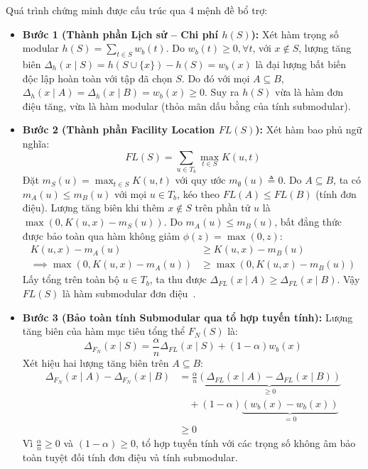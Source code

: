 \begin{cm}
\label{proof:sketch_submodular}
Quá trình chứng minh được cấu trúc qua 4 mệnh đề bổ trợ:

\begin{itemize}
    \item \textbf{Bước 1 (Thành phần Lịch sử -- Chi phí $h(S)$):}
    Xét hàm trọng số modular $h(S) = \sum_{t \in S} w_b(t)$. Do $w_b(t) \ge 0, \forall t$, với $x \notin S$, lượng tăng biên $\Delta_h(x \mid S) = h(S \cup \{x\}) - h(S) = w_b(x)$ là đại lượng bất biến độc lập hoàn toàn với tập đã chọn $S$. Do đó với mọi $A \subseteq B$, $\Delta_h(x \mid A) = \Delta_h(x \mid B) = w_b(x) \ge 0$. Suy ra $h(S)$ vừa là hàm đơn điệu tăng, vừa là hàm modular (thỏa mãn dấu bằng của tính submodular).
    
    \item \textbf{Bước 2 (Thành phần Facility Location $FL(S)$):}
    Xét hàm bao phủ ngữ nghĩa:
    \begin{equation}
    FL(S) = \sum_{u \in T_b} \max_{t \in S} K(u, t)
    \end{equation}
    Đặt $m_S(u) = \max_{t \in S} K(u, t)$ với quy ước $m_\emptyset(u) \triangleq 0$. Do $A \subseteq B$, ta có $m_A(u) \le m_B(u)$ với mọi $u \in T_b$, kéo theo $FL(A) \le FL(B)$ (tính đơn điệu).
    Lượng tăng biên khi thêm $x \notin S$ trên phần tử $u$ là $\max(0, K(u, x) - m_S(u))$. Do $m_A(u) \le m_B(u)$, bất đẳng thức được bảo toàn qua hàm không giảm $\phi(z) = \max(0, z)$:
    \begin{align}
    K(u, x) - m_A(u) &\ge K(u, x) - m_B(u) \nonumber \\
    \implies \max\left(0, K(u, x) - m_A(u)\right) &\ge \max\left(0, K(u, x) - m_B(u)\right)
    \end{align}
    Lấy tổng trên toàn bộ $u \in T_b$, ta thu được $\Delta_{FL}(x \mid A) \ge \Delta_{FL}(x \mid B)$. Vậy $FL(S)$ là hàm submodular đơn điệu~\cite{cornuejols1977uncapacitated}.
    
    \item \textbf{Bước 3 (Bảo toàn tính Submodular qua tổ hợp tuyến tính):}
    Lượng tăng biên của hàm mục tiêu tổng thể $F_N(S)$ là:
    \begin{equation}
    \Delta_{F_N}(x \mid S) = \frac{\alpha}{n} \Delta_{FL}(x \mid S) + (1 - \alpha) w_b(x)
    \end{equation}
    Xét hiệu hai lượng tăng biên trên $A \subseteq B$:
    \begin{align}
    \Delta_{F_N}(x \mid A) - \Delta_{F_N}(x \mid B) 
    &= \frac{\alpha}{n} \underbrace{\left(\Delta_{FL}(x \mid A) - \Delta_{FL}(x \mid B)\right)}_{\ge 0} \nonumber \\
    &\quad + (1 - \alpha) \underbrace{(w_b(x) - w_b(x))}_{= 0} \nonumber \\
    &\ge 0
    \end{align}
    Vì $\frac{\alpha}{n} \ge 0$ và $(1 - \alpha) \ge 0$, tổ hợp tuyến tính với các trọng số không âm bảo toàn tuyệt đối tính đơn điệu và tính submodular.
    

\end{itemize}
\end{cm}
